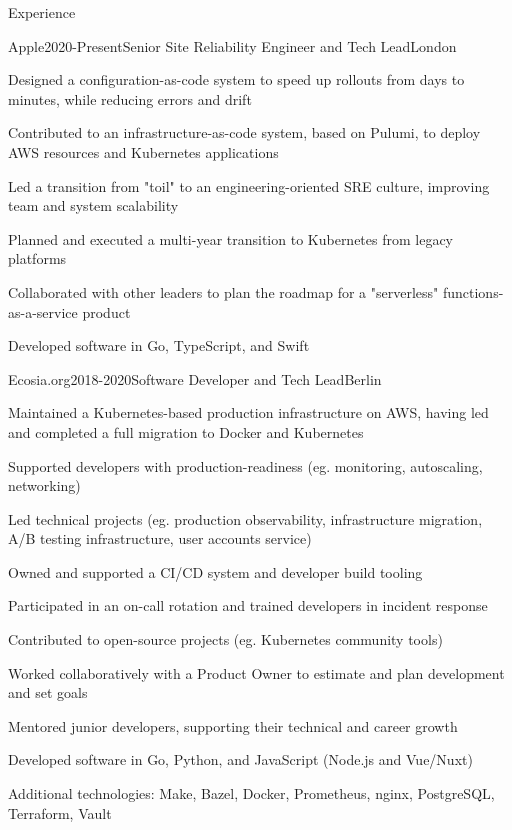 \documentclass{resume} %
\begin{document}
\vspace{5 mm}

\begin{rSection}{Experience}

\begin{rSubsection}{{Apple}}{2020-Present}{Senior Site Reliability Engineer and Tech Lead}{London}
    \item Designed a configuration-as-code system to speed up rollouts from days to minutes, while reducing errors and drift
    \item Contributed to an infrastructure-as-code system, based on Pulumi, to deploy AWS resources and Kubernetes applications
    \item Led a transition from "toil" to an engineering-oriented SRE culture, improving team and system scalability
    \item Planned and executed a multi-year transition to Kubernetes from legacy platforms
    \item Collaborated with other leaders to plan the roadmap for a "serverless" functions-as-a-service product
    \item Developed software in Go, TypeScript, and Swift
\end{rSubsection}

\begin{rSubsection}{{Ecosia.org}}{2018-2020}{Software Developer and Tech Lead}{Berlin}
    \item Maintained a Kubernetes-based production infrastructure on AWS, having led and completed a full migration to Docker and Kubernetes
    \item Supported developers with production-readiness (eg. monitoring, autoscaling, networking)
    \item Led technical projects (eg. production observability, infrastructure migration, A/B testing infrastructure, user accounts service)
    \item Owned and supported a CI/CD system and developer build tooling
    \item Participated in an on-call rotation and trained developers in incident response
    \item Contributed to open-source projects (eg. Kubernetes community tools)
    \item Worked collaboratively with a Product Owner to estimate and plan development and set goals
    \item Mentored junior developers, supporting their technical and career growth
    \item Developed software in Go, Python, and JavaScript (Node.js and Vue/Nuxt)
    \item Additional technologies: Make, Bazel, Docker, Prometheus, nginx, PostgreSQL, Terraform, Vault
\end{rSubsection}


\end{rSection}
\end{document}
